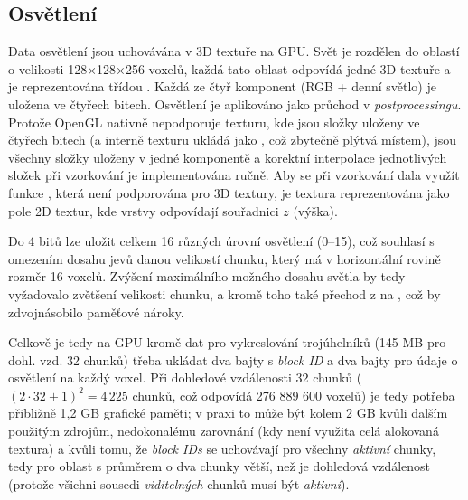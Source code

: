 
\subsection{Osvětlení} \label{lightingImpl}
Data osvětlení jsou uchovávána v 3D textuře na GPU. Svět je rozdělen do oblastí o velikosti 128×128×256 voxelů, každá tato oblast odpovídá jedné 3D textuře a je reprezentována třídou . Každá ze čtyř komponent (RGB + denní světlo) je uložena ve čtyřech bitech. Osvětlení je aplikováno jako průchod v \textit{postprocessingu}. Protože OpenGL nativně nepodporuje texturu, kde jsou složky uloženy ve čtyřech bitech (a interně texturu  ukládá jako , což zbytečně plýtvá místem), jsou všechny složky uloženy v jedné komponentě  a korektní interpolace jednotlivých složek při vzorkování je implementována ručně. Aby se při vzorkování dala využít funkce , která není podporována pro 3D textury, je textura reprezentována jako pole 2D textur, kde vrstvy odpovídají souřadnici $z$ (výška).

Do 4 bitů lze uložit celkem 16 různých úrovní osvětlení (0--15), což souhlasí s omezením dosahu jevů danou velikostí chunku, který má v horizontální rovině rozměr 16 voxelů. Zvýšení maximálního možného dosahu světla by tedy vyžadovalo zvětšení velikosti chunku, a kromě toho také přechod z  na , což by zdvojnásobilo paměťové nároky.

Celkově je tedy na GPU kromě dat pro vykreslování trojúhelníků (145 MB pro dohl. vzd. 32 chunků) třeba ukládat dva bajty s \textit{block ID} a dva bajty pro údaje o osvětlení na každý voxel. Při dohledové vzdálenosti 32 chunků ($(2\cdot32+1)^2 = 4\,225$ chunků, což odpovídá 276 889 600 voxelů) je tedy potřeba přibližně 1,2 GB grafické paměti; v praxi to může být kolem 2 GB kvůli dalším použitým zdrojům, nedokonalému zarovnání (kdy není využita celá alokovaná textura) a kvůli tomu, že \textit{block IDs} se uchovávají pro všechny \textit{aktivní} chunky, tedy pro oblast s průměrem o dva chunky větší, než je dohledová vzdálenost (protože všichni sousedi \textit{viditelných} chunků musí být \textit{aktivní}).

